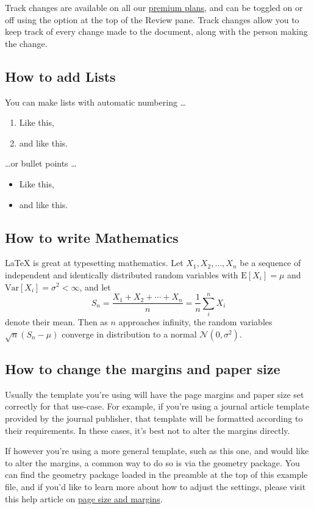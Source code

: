 \documentclass{article}
\begin{document}
	Track changes are available on all our \href{https://www.overleaf.com/user/subscription/plans}{premium plans}, and can be toggled on or off using the option at the top of the Review pane. Track changes allow you to keep track of every change made to the document, along with the person making the change. 
	
	\subsection{How to add Lists}
	
	You can make lists with automatic numbering \dots
	
	\begin{enumerate}
		\item Like this,
		\item and like this.
	\end{enumerate}
	\dots or bullet points \dots
	\begin{itemize}
		\item Like this,
		\item and like this.
	\end{itemize}
	
	\subsection{How  to write Mathematics}
	
	\LaTeX{} is great at typesetting mathematics. Let $X_1, X_2, \ldots, X_n$ be a sequence of independent and identically distributed random variables with $\text{E}[X_i] = \mu$ and $\text{Var}[X_i] = \sigma^2 < \infty$, and let
	\[S_n = \frac{X_1 + X_2 + \cdots + X_n}{n} = \frac{1}{n}\sum_{i}^{n} X_i\]
	denote their mean. Then as $n$ approaches infinity, the random variables $\sqrt{n}(S_n - \mu)$ converge in distribution to a normal $\mathcal{N}(0, \sigma^2)$.
	\subsection{How to change the margins and paper size}
	
	Usually  the template  you're using will have the page margins and paper size set correctly for that use-case. For example, if you're using a journal article template provided by the journal publisher, that template will be formatted according to their requirements. In these cases, it's best not to alter the margins directly.
	
	If however you're using a more general template, such as this one, and would like to alter the margins, a common way to do so is via the geometry package. You can find the geometry package loaded in the preamble at the top of this example file, and if you'd like to learn more about how to adjust the settings, please visit this help article on \href{https://www.overleaf.com/learn/latex/page_size_and_margins}{page size and margins}.
	
\end{document}
